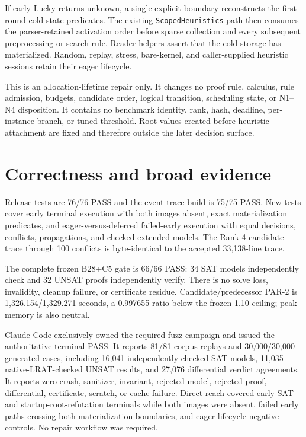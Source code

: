 \documentclass[11pt]{article}
\newcommand{\code}[1]{\texttt{#1}}
\begin{document}
If early Lucky returns unknown, a single explicit boundary reconstructs the
first-round cold-state predicates.  The existing \code{ScopedHeuristics} path
then consumes the parser-retained activation order before sparse collection
and every subsequent preprocessing or search rule.  Reader helpers assert
that the cold storage has materialized.  Random, replay, stress, bare-kernel,
and caller-supplied heuristic sessions retain their eager lifecycle.

This is an allocation-lifetime repair only.  It changes no proof rule,
calculus, rule admission, budgets, candidate order, logical transition,
scheduling state, or N1--N4 disposition.  It contains no benchmark identity,
rank, hash, deadline, per-instance branch, or tuned threshold.  Root values
created before heuristic attachment are fixed and therefore outside the later
decision surface.

\section{Correctness and broad evidence}

Release tests are 76/76 PASS and the event-trace build is 75/75 PASS.  New
tests cover early terminal execution with both images absent, exact
materialization predicates, and eager-versus-deferred failed-early execution
with equal decisions, conflicts, propagations, and checked extended models.
The Rank-4 candidate trace through 100 conflicts is byte-identical to the
accepted 33,138-line trace.

The complete frozen B28+C5 gate is 66/66 PASS: 34 SAT models independently
check and 32 UNSAT proofs independently verify.  There is no solve loss,
invalidity, cleanup failure, or certificate residue.  Candidate/predecessor
PAR-2 is 1,326.154/1,329.271 seconds, a 0.997655 ratio below the frozen 1.10
ceiling; peak memory is also neutral.

Claude Code exclusively owned the required fuzz campaign and issued the
authoritative terminal PASS.  It reports 81/81 corpus replays and
30,000/30,000 generated cases, including 16,041 independently checked SAT
models, 11,035 native-LRAT-checked UNSAT results, and 27,076 differential
verdict agreements.  It reports zero crash, sanitizer, invariant, rejected
model, rejected proof, differential, certificate, scratch, or cache failure.
Direct reach covered early SAT and startup-root-refutation terminals while
both images were absent, failed early paths crossing both materialization
boundaries, and eager-lifecycle negative controls.  No repair workflow was
required.
\end{document}
